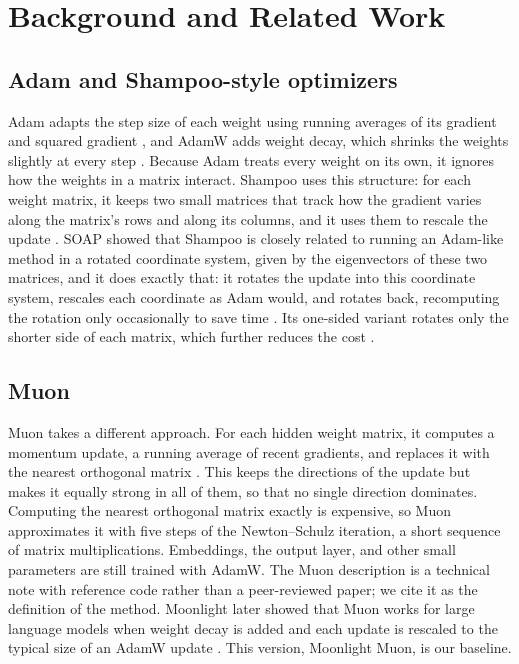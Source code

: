 \section{Background and Related Work}
\label{sec:background}

\subsection{Adam and Shampoo-style optimizers}

Adam adapts the step size of each weight using running averages of its gradient
and squared gradient \cite{kingma2015adam}, and AdamW adds weight decay, which
shrinks the weights slightly at every step \cite{loshchilov2019adamw}. Because
Adam treats every weight on its own, it ignores how the weights in a matrix
interact. Shampoo uses this structure: for each weight matrix, it keeps two
small matrices that track how the gradient varies along the matrix's rows and
along its columns, and it uses them to rescale the update
\cite{gupta2018shampoo}. SOAP showed that Shampoo is closely related to running
an Adam-like method in a rotated coordinate system, given by the eigenvectors of
these two matrices, and it does exactly that: it rotates the update into this
coordinate system, rescales each coordinate as Adam would, and rotates back,
recomputing the rotation only occasionally to save time \cite{vyas2025soap}.
Its one-sided variant rotates only the shorter side of each matrix, which
further reduces the cost \cite{vyas2025soap}.

\subsection{Muon}

Muon takes a different approach. For each hidden weight matrix, it computes a
momentum update, a running average of recent gradients, and replaces it with
the nearest orthogonal matrix \cite{jordan2024muon}. This keeps the directions
of the update but makes it equally strong in all of them, so that no single
direction dominates. Computing the nearest orthogonal matrix exactly is
expensive, so Muon approximates it with five steps of the Newton--Schulz
iteration, a short sequence of matrix multiplications. Embeddings, the output
layer, and other small parameters are still trained with AdamW. The Muon
description is a technical note with reference code rather than a peer-reviewed
paper; we cite it as the definition of the method. Moonlight later showed that
Muon works for large language models when weight decay is added and each update
is rescaled to the typical size of an AdamW update \cite{liu2025muon}. This
version, Moonlight Muon, is our baseline.

